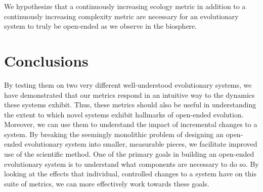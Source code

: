 \documentclass[letterpaper]{article}
\begin{document}

We hypothesize that a continuously increasing ecology metric in addition to a continuously increasing complexity metric are necessary for an evolutionary system to truly be open-ended as we observe in the biosphere.

\section{Conclusions}
By testing them on two very different well-understood evolutionary systems, we have demonstrated that our metrics respond in an intuitive way to the dynamics these systems exhibit. Thus, these metrics should also be useful in understanding the extent to which novel systems exhibit hallmarks of open-ended evolution. Moreover, we can use them to understand the impact of incremental changes to a system. By breaking the seemingly monolithic problem of designing an open-ended evolutionary system into smaller, measurable pieces, we facilitate improved use of the scientific method. One of the primary goals in building an open-ended evolutionary system is to understand what components are necessary to do so. By looking at the effects that individual, controlled changes to a system have on this suite of metrics, we can more effectively work towards these goals.


\end{document}
